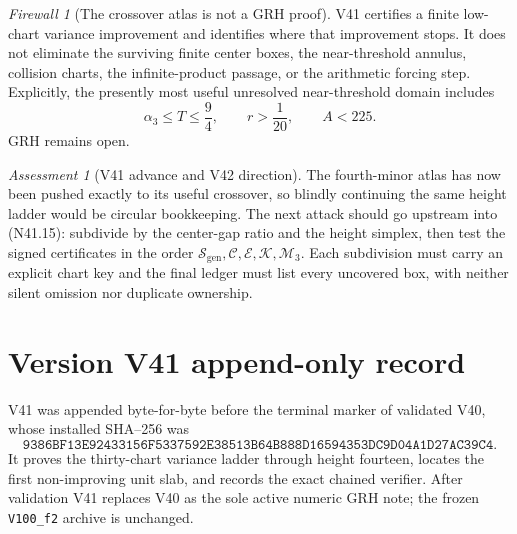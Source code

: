 \documentclass[11pt]{article}
\theoremstyle{definition}
\theoremstyle{remark}
\newtheorem{assessment}[theorem]{Assessment}
\newtheorem{firewall}[theorem]{Firewall}
\begin{document}
\begin{firewall}[The crossover atlas is not a GRH proof]
\label{fire:f2v41}
V41 certifies a finite low-chart variance improvement and identifies
where that improvement stops.  It does not eliminate the surviving
finite center boxes, the near-threshold annulus, collision charts, the
infinite-product passage, or the arithmetic forcing step.  Explicitly,
the presently most useful unresolved near-threshold domain includes
\[
 \alpha_3\leq T\leq\frac94,\qquad
 r>\frac1{20},\qquad A<225.
\tag{N41.15}
\]
GRH remains open.
\end{firewall}

\begin{assessment}[V41 advance and V42 direction]
\label{ass:f2v41}
The fourth-minor atlas has now been pushed exactly to its useful
crossover, so blindly continuing the same height ladder would be
circular bookkeeping.  The next attack should go upstream into
\textup{(N41.15)}: subdivide by the center-gap ratio and the height
simplex, then test the signed certificates in the order
\(\mathcal S_{\mathrm{gen}},\mathcal C,\mathcal E,\mathcal K,\mathcal
M_3\).  Each subdivision must carry an explicit chart key and the final
ledger must list every uncovered box, with neither silent omission nor
duplicate ownership.
\end{assessment}

\section*{Version V41 append-only record}

V41 was appended byte-for-byte before the terminal marker of validated
V40, whose installed SHA--256 was
\[
 \texttt{9386BF13E92433156F5337592E38513B}
 \allowbreak\texttt{64B888D16594353DC9D04A1D27AC39C4}.
\tag{N41.16}
\]
It proves the thirty-chart variance ladder through height fourteen,
locates the first non-improving unit slab, and records the exact chained
verifier.  After validation V41 replaces V40 as the sole active numeric
GRH note; the frozen \texttt{V100\_f2} archive is unchanged.




\end{document}
